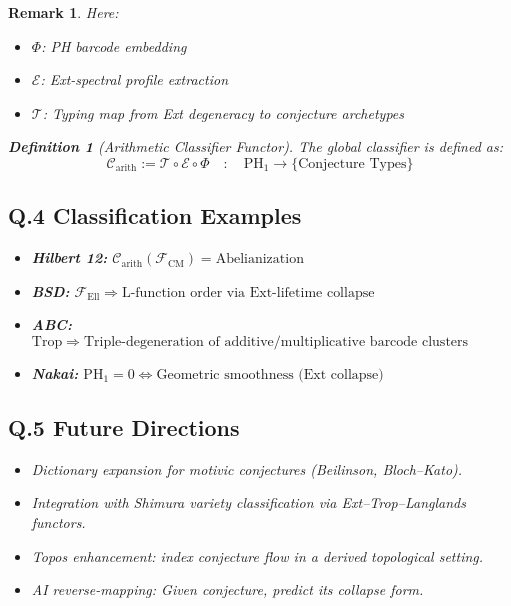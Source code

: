 \documentclass[11pt]{article}
\newtheorem{definition}[theorem]{Definition}
\newtheorem{remark}[theorem]{Remark}
\begin{document}
\begin{remark}
Here:
\begin{itemize}
  \item \( \Phi \): PH barcode embedding
  \item \( \mathcal{E} \): Ext-spectral profile extraction
  \item \( \mathcal{T} \): Typing map from Ext degeneracy to conjecture archetypes
\end{itemize}

\begin{definition}[Arithmetic Classifier Functor]
The global classifier is defined as:
\[
\mathscr{C}_{\mathrm{arith}} := \mathcal{T} \circ \mathcal{E} \circ \Phi
\quad : \quad \mathrm{PH}_1 \to \{ \text{Conjecture Types} \}
\]
\end{definition}

\subsection*{Q.4 Classification Examples}

\begin{itemize}
  \item \textbf{Hilbert 12:} \( \mathscr{C}_{\mathrm{arith}}(\mathcal{F}_{\mathrm{CM}}) = \text{Abelianization} \)
  \item \textbf{BSD:} \( \mathcal{F}_{\mathrm{Ell}} \Rightarrow \text{L-function order via Ext-lifetime collapse} \)
  \item \textbf{ABC:} \( \mathrm{Trop} \Rightarrow \text{Triple-degeneration of additive/multiplicative barcode clusters} \)
  \item \textbf{Nakai:} \( \mathrm{PH}_1 = 0 \Leftrightarrow \text{Geometric smoothness (Ext collapse)} \)
\end{itemize}

\subsection*{Q.5 Future Directions}

\begin{itemize}
  \item Dictionary expansion for motivic conjectures (Beilinson, Bloch–Kato).
  \item Integration with Shimura variety classification via Ext–Trop–Langlands functors.
  \item Topos enhancement: index conjecture flow in a derived topological setting.
  \item AI reverse-mapping: Given conjecture, predict its collapse form.
\end{itemize}


\end{remark}
\end{document}
